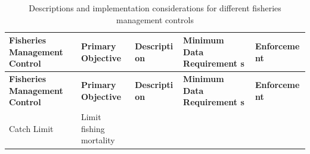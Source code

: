 \documentclass[]{book}
\begin{document}
\begin{longtable}[]{@{}lllll@{}}
\caption{\label{tab:fmcs} Descriptions and implementation considerations for
different fisheries management controls}\tabularnewline
\toprule
\begin{minipage}[b]{0.17\columnwidth}\raggedright\strut
\textbf{Fisheries Management Control}\strut
\end{minipage} & \begin{minipage}[b]{0.17\columnwidth}\raggedright\strut
\textbf{Primary Objective}\strut
\end{minipage} & \begin{minipage}[b]{0.17\columnwidth}\raggedright\strut
\textbf{Descripti on}\strut
\end{minipage} & \begin{minipage}[b]{0.17\columnwidth}\raggedright\strut
\textbf{Minimum Data Requirement s}\strut
\end{minipage} & \begin{minipage}[b]{0.17\columnwidth}\raggedright\strut
\textbf{Enforceme nt}\strut
\end{minipage}\tabularnewline
\midrule
\endfirsthead
\toprule
\begin{minipage}[b]{0.17\columnwidth}\raggedright\strut
\textbf{Fisheries Management Control}\strut
\end{minipage} & \begin{minipage}[b]{0.17\columnwidth}\raggedright\strut
\textbf{Primary Objective}\strut
\end{minipage} & \begin{minipage}[b]{0.17\columnwidth}\raggedright\strut
\textbf{Descripti on}\strut
\end{minipage} & \begin{minipage}[b]{0.17\columnwidth}\raggedright\strut
\textbf{Minimum Data Requirement s}\strut
\end{minipage} & \begin{minipage}[b]{0.17\columnwidth}\raggedright\strut
\textbf{Enforceme nt}\strut
\end{minipage}\tabularnewline
\midrule
\endhead
\begin{minipage}[t]{0.19\columnwidth}\raggedright\strut
Catch Limit\strut
\end{minipage} & \begin{minipage}[t]{0.19\columnwidth}\raggedright\strut
Limit fishing mortality\strut
\end{minipage} & \begin{minipage}[t]{0.19\columnwidth}\raggedright\strut

\end{minipage}
\end{longtable}
\end{document}
